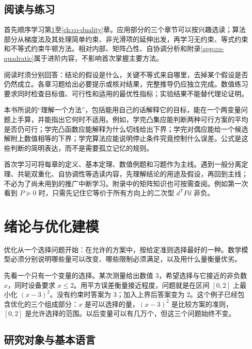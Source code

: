 \documentclass[UTF8,12pt,a4paper,fontset=fandol]{ctexbook}
\begin{document}
\section*{阅读与练习}

首先顺序学习第\ref{ch:co-introduction}至\ref{ch:co-duality}章。应用部分的三个章节可以按兴趣选读；算法部分从梯度法及其处理简单约束、非光滑项的延伸出发，再学习无约束、等式约束和不等式约束牛顿方法。相对内部、矩阵凸性、自协调分析和附录\ref{app:co-quadratic}属于进阶内容，不影响首次掌握主要方法。

阅读时须分别回答：结论的假设是什么，关键不等式来自哪里，去掉某个假设是否仍然成立。各章习题给出必要提示或核对结果，完整推导仍应独立完成。数值练习要求同时检查目标值、可行性和适用的最优性指标；实验结果不能替代理论证明。

本书所说的“理解一个方法”，包括能用自己的话解释它的目标，能在一个两变量问题上手算，并能指出它何时不适用。例如，学完凸集应能判断两种可行方案的平均是否仍可行；学完凸函数应能解释为什么切线给出下界；学完对偶应能给一个候选解附上数值相等的下界；学完算法应能说明停止条件究竟控制什么误差。公式是这些判断的简明表达，而不是需要孤立记忆的规则。

首次学习可将每章的定义、基本定理、数值例题和习题作为主线。遇到一般分离定理、共轭双重化、自协调性等选读内容，先理解结论的用途及假设，再回到主线；不必为了尚未用到的推广中断学习。附录中的矩阵知识也可按需查阅。例如第一次看到 $P\succeq0$ 时，只需先记住它等价于所有方向上的二次型 $d^{\mathsf T}Pd$ 非负。

\chapter{绪论与优化建模}
\label{ch:co-introduction}

优化从一个选择问题开始：在允许的方案中，按给定准则选择最好的一种。数学模型必须分别说明哪些量可以改变、哪些限制必须满足，以及用什么量衡量优劣。

先看一个只有一个变量的选择。某次测量给出数值 $3$，希望选择与它接近的非负数 $x$，同时设备要求 $x\leq2$。用平方误差衡量接近程度，问题就是在区间 $[0,2]$ 上最小化 $(x-3)^2$。没有约束时答案为 $3$；加入上界后答案变为 $2$。这个例子已经包含优化的三个组成部分：$x$ 是可以选择的量，$(x-3)^2$ 是比较方案的准则，$[0,2]$ 是允许选择的范围。以后变量可以有几万个，但这三个问题始终不变。

\section{研究对象与基本语言}
\end{document}
